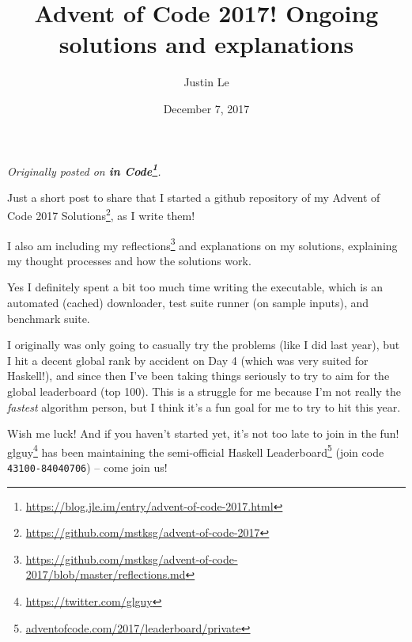 \documentclass[]{article}
\title{Advent of Code 2017! Ongoing solutions and explanations}
\author{Justin Le}
\date{December 7, 2017}
\renewcommand{\href}[2]{#2\footnote{\url{#1}}}
\begin{document}
\maketitle

\emph{Originally posted on
\textbf{\href{https://blog.jle.im/entry/advent-of-code-2017.html}{in Code}}.}

Just a short post to share that I started a github repository of my
\href{https://github.com/mstksg/advent-of-code-2017}{Advent of Code 2017
Solutions}, as I write them!

I also am including my
\href{https://github.com/mstksg/advent-of-code-2017/blob/master/reflections.md}{reflections}
and explanations on my solutions, explaining my thought processes and how the
solutions work.

Yes I definitely spent a bit too much time writing the executable, which is an
automated (cached) downloader, test suite runner (on sample inputs), and
benchmark suite.

I originally was only going to casually try the problems (like I did last year),
but I hit a decent global rank by accident on Day 4 (which was very suited for
Haskell!), and since then I've been taking things seriously to try to aim for
the global leaderboard (top 100). This is a struggle for me because I'm not
really the \emph{fastest} algorithm person, but I think it's a fun goal for me
to try to hit this year.

Wish me luck! And if you haven't started yet, it's not too late to join in the
fun! \href{https://twitter.com/glguy}{glguy} has been maintaining the
semi-official \href{adventofcode.com/2017/leaderboard/private}{Haskell
Leaderboard} (join code \texttt{43100-84040706}) -- come join us!
\end{document}
